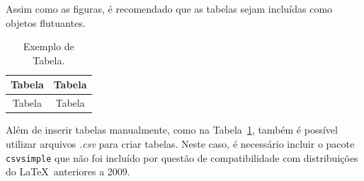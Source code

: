 Assim como as figuras, é recomendado que as tabelas sejam incluídas como
objetos flutuantes.
\begin{table}[!htb]
\caption{Exemplo de Tabela.}
\label{tab:exem}
\centering
\begin{tabular}{cc}
\toprule
Tabela & Tabela \\
\midrule
Tabela & Tabela \\
\bottomrule
\end{tabular}
\end{table}

Além de inserir tabelas manualmente, como na Tabela~\ref{tab:exem}, também é
possível utilizar arquivos \emph{.csv} para criar tabelas. Neste caso, é
necessário incluir o pacote \texttt{csvsimple} que não foi incluído por questão
de compatibilidade com distribuições do \LaTeX \ anteriores a 2009.
